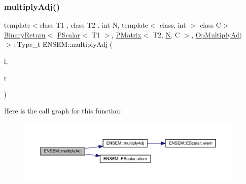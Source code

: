 \subsubsection{\texorpdfstring{multiplyAdj()}{multiplyAdj()}\hspace{0.1cm}{\footnotesize\ttfamily [2/3]}}
{\footnotesize\ttfamily template$<$class T1 , class T2 , int N, template$<$ class, int $>$ class C$>$ \\
\mbox{\hyperlink{structENSEM_1_1BinaryReturn}{Binary\+Return}}$<$ \mbox{\hyperlink{classENSEM_1_1PScalar}{P\+Scalar}}$<$ T1 $>$, \mbox{\hyperlink{classENSEM_1_1PMatrix}{P\+Matrix}}$<$ T2, \mbox{\hyperlink{adat__devel_2lib_2hadron_2operator__name__util_8cc_a7722c8ecbb62d99aee7ce68b1752f337}{N}}, C $>$, \mbox{\hyperlink{structENSEM_1_1OpMultiplyAdj}{Op\+Multiply\+Adj}} $>$\+::Type\+\_\+t E\+N\+S\+E\+M\+::multiply\+Adj (\begin{DoxyParamCaption}\item[{const \mbox{\hyperlink{classENSEM_1_1PScalar}{P\+Scalar}}$<$ T1 $>$ \&}]{l,  }\item[{const \mbox{\hyperlink{classENSEM_1_1PMatrix}{P\+Matrix}}$<$ T2, \mbox{\hyperlink{adat__devel_2lib_2hadron_2operator__name__util_8cc_a7722c8ecbb62d99aee7ce68b1752f337}{N}}, C $>$ \&}]{r }\end{DoxyParamCaption})\hspace{0.3cm}{\ttfamily [inline]}}

Here is the call graph for this function\+:\nopagebreak
\begin{figure}[H]
\begin{center}
\leavevmode
\includegraphics[width=350pt]{df/d0a/group__primmatrix_ga500e40c33d8e7e4a2a95970fb8a56326_cgraph}
\end{center}
\end{figure}
\mbox{\label{group__primmatrix_gaf37104443218a1cbaa8ab848065a0a09}} 
